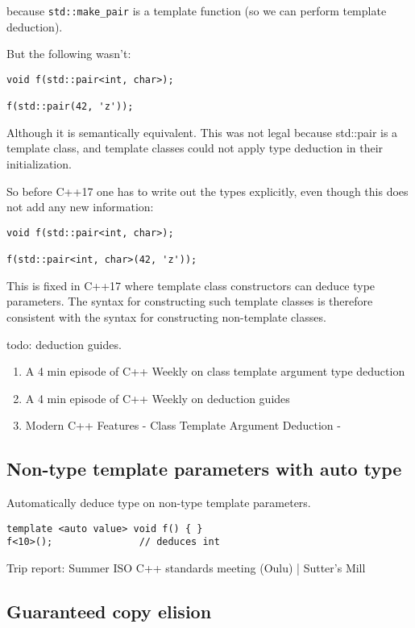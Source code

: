 because \texttt{std::make_pair} is a template function (so we can perform template deduction). 

But the following wasn’t:

\begin{verbatim}
void f(std::pair<int, char>);

f(std::pair(42, 'z'));
\end{verbatim}

Although it is semantically equivalent. This was not legal because std::pair is a template class, and template classes could not apply type deduction in their initialization.

So before C++17 one has to write out the types explicitly, even though this does not add any new information:

\begin{verbatim}
void f(std::pair<int, char>);

f(std::pair<int, char>(42, 'z'));
\end{verbatim}

This is fixed in C++17 where template class constructors can deduce type parameters. The syntax for constructing such template classes is therefore consistent with the syntax for constructing non-template classes.

todo: deduction guides.

\begin{enumerate}
\item A 4 min episode of C++ Weekly on class template argument type deduction
\item A 4 min episode of C++ Weekly on deduction guides
\item Modern C++ Features - Class Template Argument Deduction -
\end{enumerate}

\subsection{Non-type template parameters with auto type}

Automatically deduce type on non-type template parameters.

\begin{verbatim}
template <auto value> void f() { }
f<10>();               // deduces int
\end{verbatim}

Trip report: Summer ISO C++ standards meeting (Oulu) | Sutter’s Mill

\subsection{Guaranteed copy elision}

